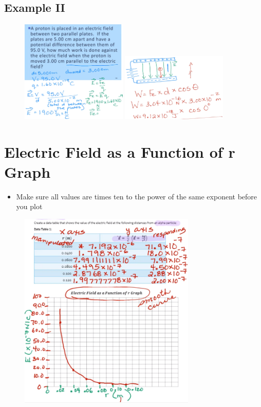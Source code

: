 \documentclass[a4paper,12pt]{article}
\begin{document}
\subsection{Example II}
\begin{figure}[H]
    \centering
    \includegraphics[width=0.45\textwidth]{workplate1}
    \includegraphics[width=0.45\textwidth]{workplate2}
\end{figure}

\section{Electric Field as a Function of r Graph}
\begin{itemize}
    \item{Make sure all values are times ten to the power of the same exponent before you plot}
\end{itemize}

\begin{figure}[H]
    \centering
    \includegraphics[width=0.75\textwidth]{graph1}
\end{figure}
\end{document}
